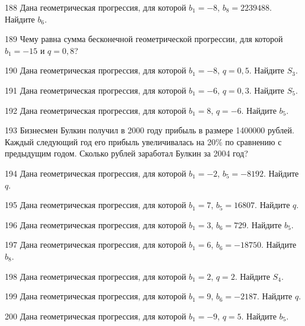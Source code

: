 \documentclass[4apaper]{article}
\begin{document}
\begin{taskBN}{188}
Дана геометрическая прогрессия, для которой $b_1 = -8$, $b_{8}=2239488$. Найдите $b_{6}$.
\end{taskBN}

\begin{taskBN}{189}
Чему равна сумма бесконечной геометрической прогрессии, для которой $b_1 = -15$ и $q=0,8$?
\end{taskBN}

\begin{taskBN}{190}
Дана геометрическая прогрессия, для которой $b_1 = -8$, $q=0,5$. Найдите $S_{3}$.
\end{taskBN}

\begin{taskBN}{191}
Дана геометрическая прогрессия, для которой $b_1 = -6$, $q=0,3$. Найдите $S_{5}$.
\end{taskBN}

\begin{taskBN}{192}
Дана геометрическая прогрессия, для которой $b_1 = 8$, $q=-6$. Найдите $b_{5}$.
\end{taskBN}

\begin{taskBN}{193}
Бизнесмен Булкин получил в 2000 году прибыль в размере 1400000 рублей. Каждый следующий год его прибыль увеличивалась на 20\% по сравнению с предыдущим годом. Сколько рублей заработал Булкин за 2004 год?
\end{taskBN}

\begin{taskBN}{194}
Дана геометрическая прогрессия, для которой $b_1 = -2$, $b_{5}=-8192$. Найдите $q$.
\end{taskBN}

\begin{taskBN}{195}
Дана геометрическая прогрессия, для которой $b_1 = 7$, $b_{5}=16807$. Найдите $q$.
\end{taskBN}

\begin{taskBN}{196}
Дана геометрическая прогрессия, для которой $b_1 = 3$, $b_{6}=729$. Найдите $b_{5}$.
\end{taskBN}

\begin{taskBN}{197}
Дана геометрическая прогрессия, для которой $b_1 = 6$, $b_{6}=-18750$. Найдите $b_{8}$.
\end{taskBN}

\begin{taskBN}{198}
Дана геометрическая прогрессия, для которой $b_1 = 2$, $q=2$. Найдите $S_{4}$.
\end{taskBN}

\begin{taskBN}{199}
Дана геометрическая прогрессия, для которой $b_1 = 9$, $b_{6}=-2187$. Найдите $q$.
\end{taskBN}

\begin{taskBN}{200}
Дана геометрическая прогрессия, для которой $b_1 = -9$, $q=5$. Найдите $b_{5}$.
\end{taskBN}
\end{document}
